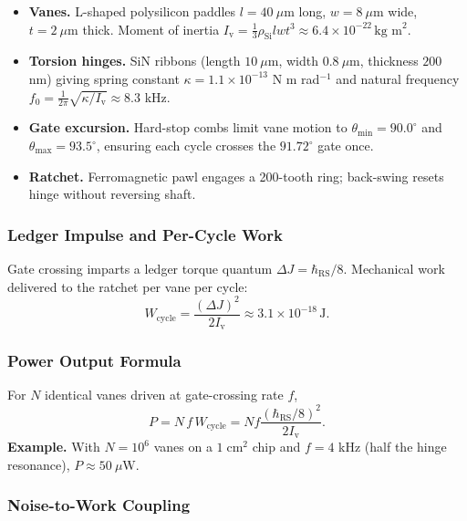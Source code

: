\documentclass[11pt,oneside]{book}
\begin{document}
\begin{itemize}[leftmargin=*,itemsep=2pt]
\item \textbf{Vanes.}  
      L-shaped polysilicon paddles \(l=40~\mu\text{m}\) long,
      \(w=8~\mu\text{m}\) wide, \(t=2~\mu\text{m}\) thick.  
      Moment of inertia  
      \(I_{\mathrm v} = \frac{1}{3}\rho_{\text{Si}}lwt^{3}
                      \approx 6.4\times10^{-22}\,\text{kg m}^{2}\).
\item \textbf{Torsion hinges.}  
      SiN ribbons (length \(10~\mu\text{m}\), width \(0.8~\mu\text{m}\),
      thickness \(200\) nm) giving spring constant  
      \(\kappa = 1.1\times10^{-13}\) N m rad\(^{-1}\) and natural
      frequency \(f_{0}= \tfrac1{2\pi}\sqrt{\kappa/I_{\mathrm v}}
                      \approx 8.3\) kHz.
\item \textbf{Gate excursion.}  
      Hard-stop combs limit vane motion to  
      \(\theta_{\min}=90.0^\circ\) and
      \(\theta_{\max}=93.5^\circ\), ensuring each cycle crosses the
      \(91.72^\circ\) gate once.
\item \textbf{Ratchet.}  
      Ferromagnetic pawl engages a 200-tooth ring;
      back-swing resets hinge without reversing shaft.
\end{itemize}

\subsubsection{Ledger Impulse and Per-Cycle Work}
\label{ss:oturbine-impulse}

Gate crossing imparts a ledger torque quantum
\(\Delta J = \hbar_{\mathrm{RS}}/8\).
Mechanical work delivered to the ratchet per vane per cycle:
\[
   W_{\mathrm{cycle}}
   = \frac{(\Delta J)^{2}}{2I_{\mathrm v}}
   \approx 3.1\times10^{-18}\,\text{J}.
\]

\subsubsection{Power Output Formula}
\label{ss:oturbine-power}

For \(N\) identical vanes driven at gate-crossing rate \(f\),
\[
   P
   = N\,f\,W_{\mathrm{cycle}}
   = Nf\frac{(\hbar_{\mathrm{RS}}/8)^{2}}{2I_{\mathrm v}}.
\]
\textbf{Example.}  
With \(N=10^{6}\) vanes on a \(1\;\text{cm}^{2}\) chip and
\(f=4\) kHz (half the hinge resonance),
\(P\approx 50~\mu\text{W}\).

\subsubsection{Noise-to-Work Coupling}
\label{ss:oturbine-noise}
\end{document}
